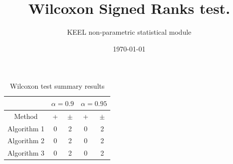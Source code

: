\documentclass[a4paper,10pt]{article}
\title{Wilcoxon Signed Ranks test.}
\date{\today}
\author{KEEL non-parametric statistical module}
\begin{document}
\pagestyle{empty}
\maketitle
\thispagestyle{empty}


\begin{table}
\centering\scriptsize
{}
\caption{Ranks computed by the Wilcoxon test}

\end{table}

 \clearpage 


\begin{table}
\centering\scriptsize
{}
\caption{Summary of the Wilcoxon test. \textbullet = the method in the row improves the method of the column. \textopenbullet = the method in the column improves the method of the row. Upper diagonal of level significance $\alpha=0.9$,Lower diagonal level of significance $\alpha=0.95$}

\end{table}

 \clearpage 


\begin{table}[!htp]
\centering\scriptsize
\begin{tabular}{
|c|c|c|c|c|}
\hline
&\multicolumn{2}{c|}{$\alpha=0.9$} & \multicolumn{2}{c|}{$\alpha=0.95$}\\\hline
Method & + & $\pm$ & + & $\pm$ \\
\hline
Algorithm 1 & 0 & 2 & 0 & 2\\
\hline
Algorithm 2 & 0 & 2 & 0 & 2\\
\hline
Algorithm 3 & 0 & 2 & 0 & 2\\
\hline

\end{tabular}
\caption{Wilcoxon test summary results}

\end{table}

 \clearpage 
\end{document}
